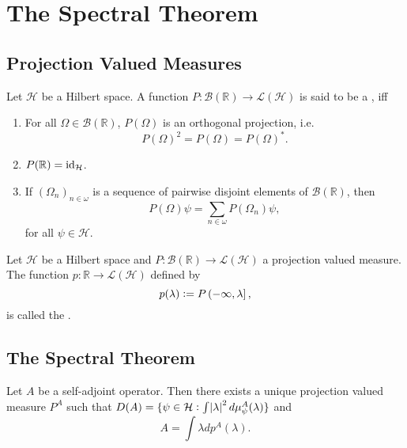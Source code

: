 \section*{The Spectral Theorem}
\subsection*{Projection Valued Measures}

\begin{definition}
	Let $\mathcal{H}$ be a Hilbert space. A function $P : \mathcal{B}(\mathbb{R}) \to \mathcal{L}(\mathcal{H})$ is said to be a , iff
	\begin{enumerate}[label = \textup{(}\roman*\textup{)},wide=0pt]
		\item For all $\Omega \in \mathcal{B}(\mathbb{R})$, $P(\Omega)$ is an orthogonal projection, i.e. 
			\begin{equation*}
				P(\Omega)^2 = P(\Omega) = P(\Omega)^*.
			\end{equation*}
		\item $P(\mathbb{R}) = \operatorname{id}_\mathcal{H}$.
		\item If $(\Omega_n)_{n \in \omega}$ is a sequence of pairwise disjoint elements of $\mathcal{B}(\mathbb{R})$, then
			\begin{equation*}
				P(\Omega)\psi = \sum_{n \in \omega} P(\Omega_n)\psi,
			\end{equation*}
			\noindent for all $\psi \in \mathcal{H}$.
	\end{enumerate}
\end{definition}

\begin{definition}
	Let $\mathcal{H}$ be a Hilbert space and $P : \mathcal{B}(\mathbb{R}) \to \mathcal{L}(\mathcal{H})$ a projection valued measure. The function $p : \mathbb{R} \to \mathcal{L}(\mathcal{H})$ defined by
	\begin{equation*}
		p(\lambda) := P\intoc{-\infty,\lambda},
	\end{equation*}
	\noindent is called the .
\end{definition}

\subsection*{The Spectral Theorem}

\begin{theorem}
	Let $A$ be a self-adjoint operator. Then there exists a unique projection valued measure $P^A$ such that $D(A) = \cbr[0]{\psi \in \mathcal{H} : \int \abs{\lambda}^2 d\mu_\psi^A(\lambda)}$ and
	\begin{equation*}
		A = \int \lambda dp^A(\lambda).
	\end{equation*}
\end{theorem}

